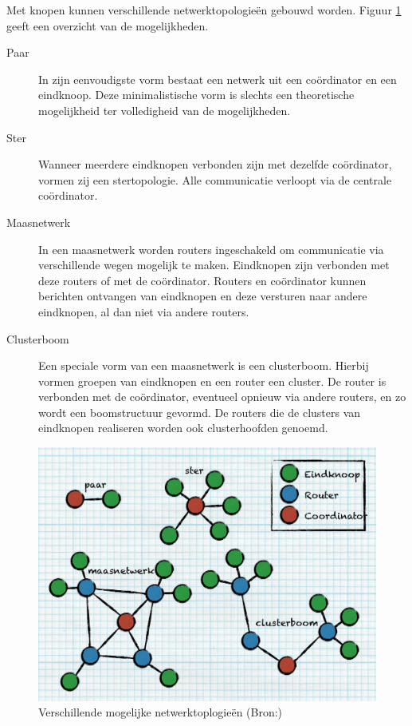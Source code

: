 Met knopen kunnen verschillende netwerktopologie\"en gebouwd worden. Figuur
\ref{fig:topologie} geeft een overzicht van de mogelijkheden.

\begin{description}

  \item[Paar] In zijn eenvoudigste vorm bestaat een netwerk uit een
  co\"ordinator en een eindknoop. Deze minimalistische vorm is slechts een
  theoretische mogelijkheid ter volledigheid van de mogelijkheden.
  
  \item[Ster] Wanneer meerdere eindknopen verbonden zijn met dezelfde
  co\"ordinator, vormen zij een stertopologie. Alle communicatie verloopt via
  de centrale co\"ordinator.
  
  \item[Maasnetwerk] In een maasnetwerk worden routers ingeschakeld om
  communicatie via verschillende wegen mogelijk te maken. Eindknopen zijn
  verbonden met deze routers of met de co\"ordinator. Routers en co\"ordinator
  kunnen berichten ontvangen van eindknopen en deze versturen naar andere
  eindknopen, al dan niet via andere routers.
  
  \item[Clusterboom] Een speciale vorm van een maasnetwerk is een clusterboom.
  Hierbij vormen groepen van eindknopen en een router een cluster. De router is
  verbonden met de co\"ordinator, eventueel opnieuw via andere routers, en zo
  wordt een boomstructuur gevormd. De routers die de clusters van eindknopen
  realiseren worden ook clusterhoofden genoemd.
  
\end{description}

\begin{figure}[ht]
  \centering
  \includegraphics[width=0.7\linewidth]{resources/topology.pdf}
  \caption[Verschillende mogelijke netwerktoplogie\"en]{Verschillende mogelijke
  netwerktoplogie\"en (Bron:\citep{oreilly2010buildingwsn})}
  \label{fig:topologie}
\end{figure}

